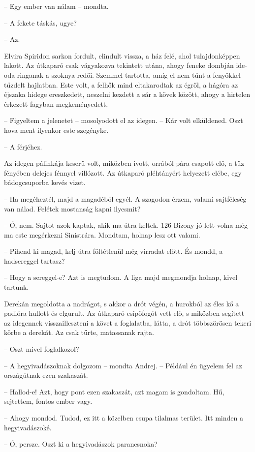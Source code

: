 \documentclass{IEEEtran}
\begin{document}
– Egy ember van nálam – mondta.

– A fekete táskás, ugye?

– Az.

Elvira Spiridon sarkon fordult, elindult vissza, a ház felé, ahol
tulajdonképpen lakott. Az útkaparó csak vágyakozva tekintett utána, ahogy
feneke dombján ide-oda ringanak a szoknya redői. Szemmel tartotta, amíg el nem
tűnt a fenyőkkel tűzdelt hajlatban. Este volt, a felhők mind eltakarodtak az
égről, a hágóra az éjszaka hidege ereszkedett, neszelni kezdett a sár a kövek
között, ahogy a hirtelen érkezett fagyban megkeményedett.

– Figyeltem a jelenetet – mosolyodott el az idegen. – Kár volt elküldened.
Oszt hova ment ilyenkor este szegényke.

– A férjéhez.

Az idegen pálinkája keserű volt, miközben ivott, orrából pára csapott elő, a
tűz fényében delejes fénnyel villózott. Az útkaparó pléhtányért helyezett
elébe, egy bádogcsuporba kevés vizet.

– Ha megéheztél, majd a magadéból egyél. A szagodon érzem, valami sajtféleség
van nálad. Felétek mostanság kapni ilyesmit?

– Ó, nem. Sajtot azok kaptak, akik ma útra keltek. 126 Bizony jó lett volna még
ma este megérkezni Sinistrára. Mondtam, holnap lesz ott valami.

– Pihend ki magad, kelj útra föltétlenül még virradat előtt. És mondd, a
hadsereggel tartasz?

– Hogy a sereggel-e? Azt is megtudom. A liga majd megmondja holnap, kivel
tartunk.

Derekán megoldotta a nadrágot, s akkor a drót végén, a hurokból az éles kő a
padlóra hullott és elgurult. Az útkaparó csípőfogót vett elő, s miközben
segített az idegennek visszailleszteni a követ a foglalatba, látta, a drót
többszörösen tekeri körbe a derekát. Az csak tűrte, matassanak rajta.

– Oszt mivel foglalkozol?

– A hegyivadászoknak dolgozom – mondta Andrej. – Például én ügyelem fel az
országútnak ezen szakaszát.

– Hallod-e! Azt, hogy pont ezen szakaszát, azt magam is gondoltam. Hű,
sejtettem, fontos ember vagy.

– Ahogy mondod. Tudod, ez itt a közelben csupa tilalmas terület. Itt minden a
hegyivadászoké.

– Ó, persze. Oszt ki a hegyivadászok parancsnoka?
\end{document}
